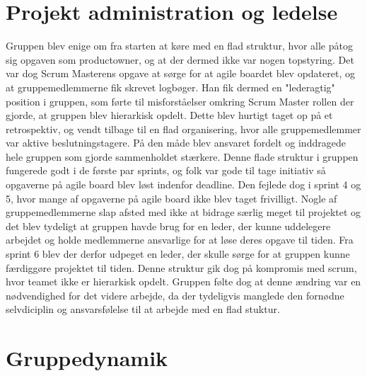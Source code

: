 \section{Projekt administration og ledelse}
Gruppen blev enige om fra starten at køre med en flad struktur, hvor alle påtog sig opgaven som productowner, og at der dermed ikke var nogen topstyring.  
Det var dog Scrum Masterens opgave at sørge for at agile boardet blev opdateret, og at gruppemedlemmerne fik skrevet logbøger. Han fik dermed en "lederagtig"
position i gruppen, som førte til misforståelser omkring Scrum Master rollen der gjorde, at gruppen blev hierarkisk opdelt. Dette blev hurtigt taget op på et 
retrospektiv, og vendt tilbage til en flad organisering, hvor alle gruppemedlemmer var aktive beslutningstagere. På den måde blev ansvaret fordelt og inddragede hele gruppen 
som gjorde sammenholdet stærkere. Denne flade struktur i gruppen fungerede godt i de første par sprints, og folk var gode til tage initiativ så opgaverne på
agile board blev løst indenfor deadline. Den fejlede dog i sprint 4 og 5, hvor mange af opgaverne på agile board ikke blev taget frivilligt. Nogle af gruppemedlemmerne
slap afsted med ikke at bidrage særlig meget til projektet og det blev tydeligt at gruppen havde brug for en leder, der kunne uddelegere arbejdet
og holde medlemmerne ansvarlige for at løse deres opgave til tiden. Fra sprint 6 blev der derfor udpeget en leder, der skulle sørge for at gruppen kunne 
færdiggøre projektet til tiden. Denne struktur gik dog på kompromis med scrum, hvor teamet ikke er hierarkisk opdelt. Gruppen følte dog at denne ændring var en
nødvendighed for det videre arbejde, da der tydeligvis manglede den fornødne selvdiciplin og ansvarsfølelse til at arbejde med en flad stuktur.       
 

\section{Gruppedynamik}
